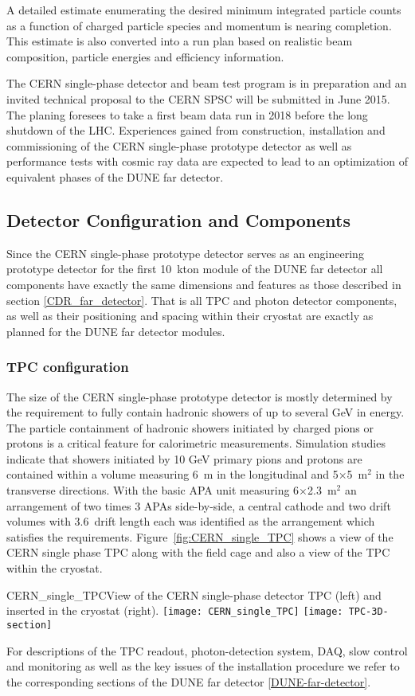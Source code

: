 A detailed estimate enumerating the desired minimum integrated particle counts as a function
of charged particle species and momentum is nearing completion. This estimate is also converted
into a run plan based on realistic beam composition, particle energies and efficiency information.

The CERN single-phase detector and beam test program is in preparation and an invited technical proposal
\cite{CERN_single-phase_proposal} to the CERN SPSC will be submitted in June 2015. The planing foresees to
take a first beam data run in 2018 before the long shutdown of the LHC. Experiences gained from construction, installation and commissioning of the CERN single-phase prototype detector as well as performance tests with
cosmic ray data are expected to lead to an optimization of equivalent phases of the DUNE far detector.

\subsection{Detector Configuration and Components}

Since the CERN single-phase prototype detector serves as an engineering prototype detector for the
first 10~kton module of the DUNE far detector all components have exactly the same dimensions
and features as those described in section \ref{CDR_far_detector}. That is all TPC and photon detector components,
as well as their positioning and spacing within their cryostat are exactly as planned for the DUNE far detector modules.

\subsubsection{TPC configuration}

The size of the CERN single-phase prototype detector is mostly determined by the requirement to fully contain hadronic showers of up to several GeV in energy.
The particle containment of hadronic showers initiated by charged pions or protons
is a critical feature for calorimetric measurements. Simulation studies indicate that showers initiated by 10 GeV
primary pions and protons are contained within a volume measuring 6~m in the longitudinal and 5$\times$5~m$^2$
in the transverse directions. With the basic APA unit measuring 6$\times$2.3~m$^2$ an arrangement of two times
3 APAs  side-by-side, a central cathode and two drift volumes with 3.6~drift length each was identified as the arrangement which satisfies the requirements. Figure~\ref{fig:CERN_single_TPC} shows a view of the CERN single phase TPC along with the field cage and also a view of the TPC within the cryostat.
%
\begin{cdrfigure}{CERN_single_TPC}{View of the CERN single-phase detector TPC (left) and inserted in the cryostat (right). }
\texttt{[image: CERN\_single\_TPC]}
\texttt{[image: TPC-3D-section]}
\end{cdrfigure}
%
For descriptions of the TPC readout, photon-detection system, DAQ, slow control and monitoring as well as
the key issues of the installation procedure we refer to the corresponding sections of the DUNE far
detector \ref{DUNE-far-detector}.

